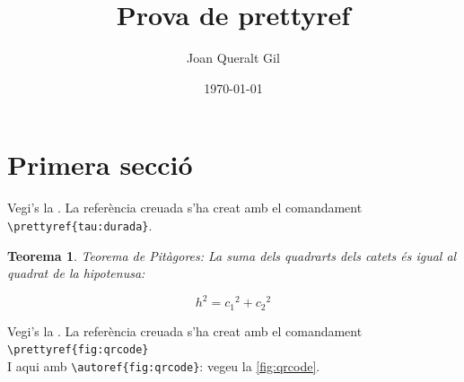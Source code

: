 \documentclass[fontsize=11pt,%
               paper=a4,%
               captions=tableheading,%
               numbers=noenddot,%
               parskip=full,%
               ]{scrartcl}
\author{Joan Queralt Gil}
\title{Prova de prettyref}
\date{\today}
\newtheorem{meuteo}{Teorema}       %
\begin{document}
\maketitle

\tableofcontents
\newpage
\section{Primera secció}\label{sec:primera}
\lipsum[1]

\begin{tcolorbox}[%
skin=beamer,                  %
width=\linewidth-2cm,         %
fonttitle=\sffamily\bfseries, %
coltitle=black,               %
colframe=yellow!50!red,       %
colback=white,                %
title=Referència a taula]     %
Vegi's la . La referència creuada s'ha creat amb el comandament \verb+\prettyref{tau:durada}+.
\end{tcolorbox}

\lipsum[2-3]


\begin{meuteo}\label{teo:pitagores}
 Teorema de Pitàgores: La suma dels quadrarts dels catets és igual al quadrat de la hipotenusa:
 
 \[h^2 = c_1{^2} + c_2{^2} \]
\end{meuteo}

\lipsum[2-3]

\begin{tcolorbox}[%
skin=beamer,      
width=\linewidth-2cm,         %
fonttitle=\sffamily\bfseries, %
coltitle=black,               %
colframe=yellow!50!red,       %
colback=white,                %
title=Referència a figura]     %
Vegi's la . La referència creuada s'ha creat amb el comandament \verb+\prettyref{fig:qrcode}+ 
\\I aqui amb \verb+\autoref{fig:qrcode}+: vegeu la \autoref{fig:qrcode}.
\end{tcolorbox}
\end{document}
